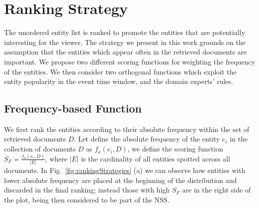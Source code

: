 \documentclass{llncs}
\begin{document}
\section{Ranking Strategy}
\label{sec:Ranking}
The unordered entity list is ranked to promote the entities that are potentially interesting for the viewer. The strategy we present in this work grounds on the assumption that the entities which appear often in the retrieved documents are important. We propose two different scoring functions for weighting the frequency of the entities. We then consider two orthogonal functions which exploit the entity popularity in the event time window, and the domain experts' rules.

\subsection{Frequency-based Function}
We first rank the entities according to their absolute frequency within the set of retrieved documents $D$. Let define the absolute frequency of the entity $e_i$ in the collection of documents $D$ as $f_a(e_i, D)$, we define the scoring function $S_F = \frac{ f_a(e_i, D) }{ |E| } $, where $|E|$ is the cardinality of all entities spotted across all documents. 
In Fig.~\ref{fig:rankingStrategies} (a) we can observe how entities with lower absolute frequency are placed at the beginning of the distribution and discarded in the final ranking; instead those with high $S_F$ are in the right side of the plot, being then considered to be part of the NSS.
\end{document}
